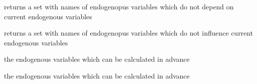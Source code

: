 \documentclass[letterpaper,10pt,english]{sphinxmanual}
\begin{document}
\begin{fulllineitems}
\begin{fulllineitems}
\end{fulllineitems}


\begin{fulllineitems}
\label{\detokenize{index:modelclass.Graph_Mixin.prevar}}
\pysigstartsignatures
{}
\pysigstopsignatures
\sphinxAtStartPar
returns a set with names of endogenopus variables which do not depend
on current endogenous variables

\end{fulllineitems}


\begin{fulllineitems}
\label{\detokenize{index:modelclass.Graph_Mixin.epivar}}
\pysigstartsignatures
{}
\pysigstopsignatures
\sphinxAtStartPar
returns a set with names of endogenopus variables which do not influence
current endogenous variables

\end{fulllineitems}


\begin{fulllineitems}
\label{\detokenize{index:modelclass.Graph_Mixin.preorder}}
\pysigstartsignatures
{}
\pysigstopsignatures
\sphinxAtStartPar
the endogenous variables which can be calculated in advance

\end{fulllineitems}


\begin{fulllineitems}
\label{\detokenize{index:modelclass.Graph_Mixin.epiorder}}
\pysigstartsignatures
{}
\pysigstopsignatures
\sphinxAtStartPar
the endogenous variables which can be calculated in advance


\end{fulllineitems}
\end{fulllineitems}
\end{document}
